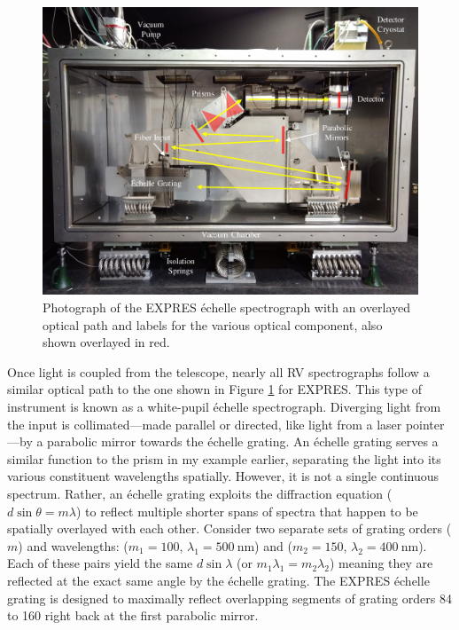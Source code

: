 \begin{figure}
    \centering
    \includegraphics[width=\textwidth]{figures-1/expres.pdf}
    \caption[The EXPRES \'echelle spectrograph and optical path]{Photograph of the EXPRES \'echelle spectrograph with an overlayed optical path and labels for the various optical component, also shown overlayed in red.}
    \label{fig:expres}
\end{figure}

Once light is coupled from the telescope, nearly all RV spectrographs follow a similar optical path to the one shown in Figure \ref{fig:expres} for EXPRES. This type of instrument is known as a white-pupil \'echelle spectrograph. Diverging light from the input is collimated---made parallel or directed, like light from a laser pointer---by a parabolic mirror towards the \'echelle grating. An \'echelle grating serves a similar function to the prism in my example earlier, separating the light into its various constituent wavelengths spatially. However, it is not a single continuous spectrum. Rather, an \'echelle grating exploits the diffraction equation ($d \sin{\theta} = m \lambda$) to reflect multiple shorter spans of spectra that happen to be spatially overlayed with each other. Consider two separate sets of grating orders ($m$) and wavelengths: ($m_1=100$, $\lambda_1=500~\mathrm{nm}$) and ($m_2=150$, $\lambda_2=400~\mathrm{nm}$). Each of these pairs yield the same $d\sin{\lambda}$ (or $m_1\lambda_1 = m_2\lambda_2$) meaning they are reflected at the exact same angle by the \'echelle grating. The EXPRES \'echelle grating is designed to maximally reflect overlapping segments of grating orders 84 to 160 right back at the first parabolic mirror.

